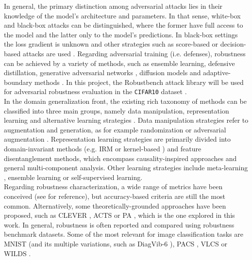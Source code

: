 In general, the primary distinction among adversarial attacks lies in
their knowledge of the model's architecture and parameters. In that
sense, white-box and black-box
attacks can be distinguished, where the former have full 
access to the model and the latter only 
to the model's predictions. In black-box settings the loss gradient
is unknown and other strategies such as score-based or
decision-based attacks are used
\cite{liReviewAdversarialAttack2022}. Regarding adversarial training (i.e. defenses), 
robustness can
be achieved by a variety of methods, 
such as ensemble learning,
defensive distillation,
generative adversarial networks
\cite{xiaoGeneratingAdversarialExamples2019, miyatoVirtualAdversarialTraining2018},
diffusion models
\cite{wangBetterDiffusionModels2023,hoDenoisingDiffusionProbabilistic2020}
and adaptive-boundary methods
\cite{cohenCertifiedAdversarialRobustness2019}.
In this project, the Robustbench attack library
\cite{croceRobustBenchStandardizedAdversarial2021a}
will be used for adversarial robustness evaluation 
in the \texttt{CIFAR10} dataset
\cite{krizhevskyLearningMultipleLayers}. \\

In the domain generalization front, the existing rich taxonomy 
of methods can be classified into three main groups, namely
data manipulation, representation learning 
and alternative learning strategies
\cite{wangGeneralizingUnseenDomains2022,zhouDomainGeneralizationSurvey2022,liuOutOfDistributionGeneralizationSurvey2023}.
Data manipulation strategies refer to augmentation and generation,
as for example randomization or adversarial augmentation
\cite{yaoImprovingOutofDistributionRobustness2022,zhangMixupEmpiricalRisk2018,yunCutMixRegularizationStrategy2019}.
Representation learning strategies are primarily divided 
into domain-invariant methods (e.g. IRM
\cite{arjovskyInvariantRiskMinimization2020} or
kernel-based
\cite{muandetDomainGeneralizationInvariant2013,arjovskyWassersteinGAN2017}) 
and feature disentanglement methods, which encompass causality-inspired
approaches and general multi-component analysis. Other 
learning strategies include meta-learning
\cite{liLearningGeneralizeMetaLearning2018,wangMetaFineTuningNeural2020},
ensemble learning or self-supervised learning. \\

Regarding robustness characterization, a wide range of metrics
have been conceived (see
\cite{guoComprehensiveEvaluationFramework2023} for reference), but
accuracy-based criteria are still the most common. Alternatively, 
some  theoretically-grounded approaches have been proposed, such
as CLEVER \cite{wengEvaluatingRobustnessNeural2018}, ACTS 
\cite{wangGeometricalApproachEvaluate2023}
or
PA
\cite{buhmannPosteriorAgreementModel2022}, 
which is the one explored in this work. 
In general, robustness is often reported and compared using 
robustness benchmark datasets. Some of the most relevant
for image classification tasks are 
MNIST (and its multiple variations, such as DiagVib-6
\cite{euligDiagViB6DiagnosticBenchmark2021}),
PACS
\cite{yuPACSDatasetPhysical2022},
VLCS
\cite{khoslaUndoingDamageDataset2012}
or WILDS
\cite{kohWILDSBenchmarkIntheWild2021}.

